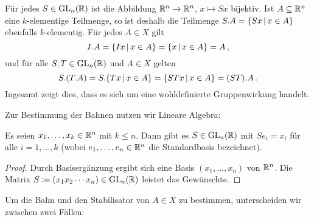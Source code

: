 \section{}





\addtocounter{subsection}{1}





\addtocounter{subsection}{1}





\addtocounter{subsection}{1}





\subsection{}

Für jedes $S \in \operatorname{GL}_{n}(\mathbb{R})$ ist die Abbildung $\mathbb{R}^n \to \mathbb{R}^n$, $x \mapsto Sx$ bijektiv.
Ist $A \subseteq \mathbb{R}^n$ eine $k$-elementige Teilmenge, so ist deshalb die Teilmenge $S.A = \{ Sx \suchthat x \in A\}$ ebenfalls $k$-elementig.
Für jedes $A \in X$ gilt
\[
    I.A
  = \{ Ix \suchthat x \in A \}
  = \{ x \suchthat x \in A \}
  = A\,,
\]
und für alle $S, T \in \operatorname{GL}_{n}(\mathbb{R})$ und $A \in X$ gelten
\[
    S.(T.A)
  = S.\{ Tx \suchthat x \in A \}
  = \{ STx \suchthat x \in A \}
  = (ST).A\,.
\]
Ingesamt zeigt dies, dass es sich um eine wohldefinierte Gruppenwirkung handelt.

Zur Bestimmung der Bahnen nutzen wir Lineare Algebra:

\begin{lemma}
  \label{lemma: transitive on linear independent}
  Es seien $x_1, \dotsc, x_k \in \mathbb{R}^n$ mit $k \leq n$.
  Dann gibt es $S \in \operatorname{GL}_{n}(\mathbb{R})$ mit $Se_i = x_i$ für alle $i = 1, \dotsc, k$ \textup(wobei $e_1, \dotsc, e_n \in \mathbb{R}^n$ die Standardbasis bezeichnet\textup).
\end{lemma}

\begin{proof}
  Durch Basisergänzung ergibt sich eine Basis $(x_1, \dotsc, x_n)$ von $\mathbb{R}^n$.
  Die Matrix $S \coloneqq (x_1 x_2 \dotsb x_n) \in \operatorname{GL}_{n}(\mathbb{R})$ leistet das Gewünschte.
\end{proof}

Um die Bahn und den Stabilisator von $A \in X$ zu bestimmen, unterscheiden wir zwischen zwei Fällen:

